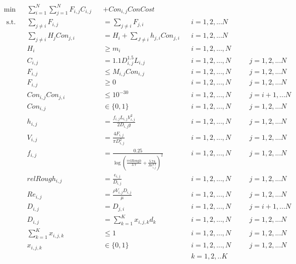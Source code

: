 \documentclass[12pt]{article}
\begin{document}
	\begin{equation}
	\begin{aligned}
	& \min &&\sum_{i=1}^{N}\sum_{j=1}^{N} F_{i,j} C_{i,j} &&+ Con_{i,j} ConCost\\
	& \text{ s.t.} && \sum_{j \neq i} F_{i,j} && = \sum_{j \neq i} F_{j,i} \quad && i = 1, 2, ... N\\
	& && \sum_{j \neq i} H_j Con_{j,i} && = H_i + \sum_{J \neq i} h_{j,i}Con_{j,i} && i = 1,2, ...N\\
	& && H_i && \geq m_i && i = 1, 2, ..., N \\
	& && C_{i,j} && = 1.1 D_{i,j}^{1.5} L_{i,j} && i = 1, 2, ..., N \quad && j = 1, 2, ... N\\
	& && F_{i,j} && \leq M_{i,j} Con_{i,j} && i = 1, 2, ..., N \quad && j = 1, 2, ... N\\
	& && F_{i,j} && \geq 0 && i = 1, 2, ..., N \quad && j = 1, 2, ... N\\
	& && Con_{i,j}Con_{j,i} && \leq 10^{-30} && i = 1, 2, ..., N \quad && j = i+1, ... N\\
	& && Con_{i,j} &&\in \{0,1\} && i = 1, 2, ..., N \quad && j = 1, 2, ... N\\
	& && h_{i,j} && = \frac{f_{i,j} L_{i,j} V_{i,j}^2}{2D_{i,j} g} && i = 1, 2, ..., N \quad && j = 1, 2, ... N\\
	& && V_{i,j} && = \frac{4 F_{i,j}}{\pi D_{i,j}^2} && i = 1, 2, ..., N \quad && j = 1, 2, ... N\\
	& && f_{i,j} &&= \frac{0.25}{\log\left(\frac{relRough}{3.7} + \frac{5.74}{Re_{i,j}^{0.9}}\right)^2} && i = 1, 2, ..., N \quad && j = 1, 2, ... N\\
	& && relRough_{i,j} && = \frac{\epsilon_{i,j}}{D_{i,j}} && i = 1, 2, ..., N \quad && j = 1, 2, ... N\\
	& && Re_{i,j} && = \frac{\rho V_{i,j} D_{i,j}}{\mu} && i = 1, 2, ..., N \quad && j = 1, 2, ... N\\
	& && D_{i,j} && = D_{j,i} && i = 1, 2, ..., N \quad && j = i+1, ... N\\
	& && D_{i,j} && = \sum_{k=1}^{K}x_{i,j,k}d_k && i = 1, 2, ..., N \quad && j = 1, 2, ... N\\
	& && \sum_{k=1}^{K} x_{i,j,k} && \leq 1 && i = 1, 2, ..., N \quad && j = 1, 2, ... N\\
	& && x_{i,j,k} && \in \{0,1\} && i = 1, 2, ..., N \quad && j = 1, 2, ... N \\
	& && && && k = 1,2, ..K\\ 
	\end{aligned}
	\end{equation}
	
\end{document}
